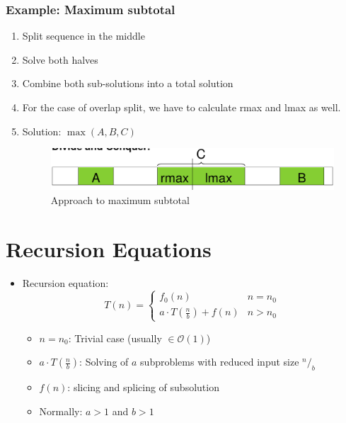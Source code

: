 \documentclass[12pt, a4paper]{scrartcl}
\newcommand{\bigO}{\mathcal{O}}
\newcommand{\imgwidth}{.7\textwidth}
\begin{document}
\subsubsection{Example: Maximum subtotal}
\begin{enumerate}
\item Split sequence in the middle
\item Solve both halves
\item Combine both sub-solutions into a total solution
\item For the case of overlap split, we have to calculate \textrm{rmax} and \textrm{lmax} as well.
\item Solution: $\max(A,B,C)$
  \begin{figure}[htbp]
    \centering
  \includegraphics[width=\imgwidth]{maximum_subtotal}
  \caption{Approach to maximum subtotal}
  \label{fig:maximum_subtotal}
\end{figure}
\end{enumerate}

\section{Recursion Equations}
\label{sec:recursion_equations}
\begin{itemize}
\item Recursion equation:
  \begin{equation}
    \label{eq:recursion_equation}
    T(n)=
    \left\{
      \begin{array}{ll}
        f_0(n)&n=n_0\\
        a\cdot T\left(\frac{n}{b}\right)+f(n)&n>n_0
      \end{array}
    \right.
  \end{equation}
  \begin{itemize}
  \item $n=n_0$: Trivial case (usually $\in\bigO(1)$)
  \item $a\cdot T\left(\frac{n}{b}\right)$: Solving of $a$ subproblems with reduced input size $^n/_b$
  \item $f(n)$: slicing and splicing of subsolution
  \item Normally: $a>1$ and $b>1$
  \end{itemize}
\end{itemize}
\end{document}
